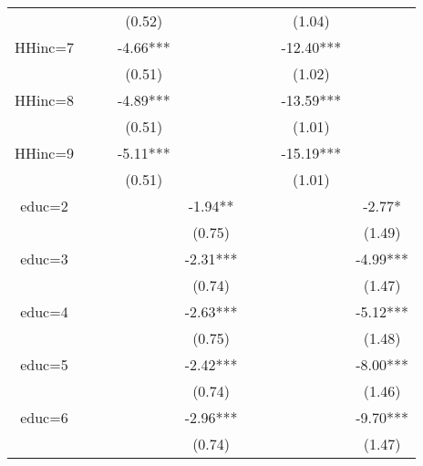 \begin{table}[ht]
\begin{adjustbox}{width={0.9\textwidth},totalheight={\textheight}}
\begin{threeparttable}
\begin{tabular}{ccccccccc}
             &          &           &     (0.52) &             &           &            &      (1.04) &              \\
HHinc=7      &          &           &   -4.66*** &             &           &            &   -12.40*** &              \\
             &          &           &     (0.51) &             &           &            &      (1.02) &              \\
HHinc=8      &          &           &   -4.89*** &             &           &            &   -13.59*** &              \\
             &          &           &     (0.51) &             &           &            &      (1.01) &              \\
HHinc=9      &          &           &   -5.11*** &             &           &            &   -15.19*** &              \\
             &          &           &     (0.51) &             &           &            &      (1.01) &              \\
educ=2       &          &           &            &     -1.94** &           &            &             &       -2.77* \\
             &          &           &            &      (0.75) &           &            &             &       (1.49) \\
educ=3       &          &           &            &    -2.31*** &           &            &             &     -4.99*** \\
             &          &           &            &      (0.74) &           &            &             &       (1.47) \\
educ=4       &          &           &            &    -2.63*** &           &            &             &     -5.12*** \\
             &          &           &            &      (0.75) &           &            &             &       (1.48) \\
educ=5       &          &           &            &    -2.42*** &           &            &             &     -8.00*** \\
             &          &           &            &      (0.74) &           &            &             &       (1.46) \\
educ=6       &          &           &            &    -2.96*** &           &            &             &     -9.70*** \\
             &          &           &            &      (0.74) &           &            &             &       (1.47) \\

\end{tabular}
\end{threeparttable}
\end{adjustbox}
\end{table}
